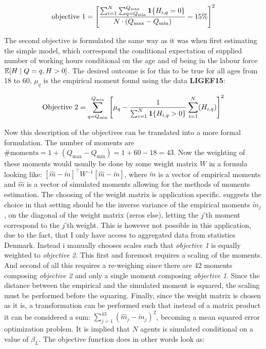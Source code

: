 \begin{equation}
    \text{objective 1} = \left[\frac{\sum_{i=1}^{N} \sum_{q=Q_{\min}}^{Q_{\max}} \mathbf{1}\{H_{i,q} = 0\}}{ N \cdot (Q_{\max} - Q_{\min} )} - 15\% \right]^2
\end{equation}

The second objective is formulated the same way as it was when first estimating the simple model, which correspond the conditional expectation of supplied number of working hours conditional on the age and of being in the labour force $ \mathbb{E}[H \mid Q=q, H>0]$. The desired outcome is for this to be true for all ages from 18 to 60, $\mu_q$ is the empirical moment found using the data \textbf{LIGEF15}:

\begin{equation}
    \text{Objective 2} = \sum_{q=Q_{\min}}^{Q_{\min}} \left[ \mu_q  - \frac{1}{\sum_{i=1}^{N} \mathbf{1}\{H_{i,q} > 0\}}\sum_{i=1}^N (H_{i,q})\right]^2
\end{equation}

Now this description of the objectives can be translated into a more formal formulation. The number of moments are $\text{\# moments}  = 1 + (Q_{\max} - Q_{\min}) = 1 + 60 - 18 = 43$. Now the weighting of these moments would usually be done by some weight matrix $W$ in a formula looking like: $[\hat{m} - \tilde{m}]^{\top} W^{-1} [\hat{m} - \tilde{m}]$, where $\tilde{m}$ is a vector of empirical moments and $\hat{m}$ is a vector of simulated moments allowing for the methods of moments estimation. The choosing of the weight matrix is application specific. \textcite{eisenhauer_estimation_2015} suggests the choice in that setting should be the inverse variance of the empirical moments $\tilde{m}_j$, on the diagonal of the weight matrix (zeros else), letting the $j$'th moment correspond to the $j$'th weight. This is however not possible in this application, due to the fact, that I only have access to aggregated data from statistics Denmark. Instead i manually chooses scales such that \textit{objective 1} is equally weighted to \textit{objective 2}. This first and foremost requires a scaling of the moments. And second of all this requires a re-weighing since there are 42 moments composing \textit{objective 2} and only a single moment composing \textit{objective 1}. Since the distance between the empirical and the simulated moment is squared, the scaling must be performed before the squaring. Finally, since the weight matrix is chosen as it is, a transformation can be performed such that instead of a matrix product it can be considered a sum: $\sum_{j = 1}
^{43} ( \hat{m}_j - \tilde{m}_j )^2$, becoming a mean squared error optimization problem. It is implied that $N$ agents is simulated conditional on a value of $\beta_L$. The objective function does in other words look as:

